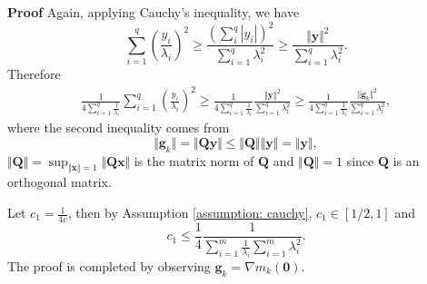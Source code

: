 \documentclass[10pt,a4paper]{amsart}
\renewenvironment{proof}[1]{\par\medskip\noindent\textbf{#1}\enspace\ignorespaces}{\par\medskip}
\begin{document}
\begin{proof}{Proof}
Again, applying Cauchy's inequality, we have
\begin{equation*}
    \sum_{i=1}^q \left(\frac{y_i}{\lambda_i}\right)^2\geq \frac{(\sum_i^q|y_i|)^2}{\sum_{i=1}^q\lambda_i^2}\geq \frac{\Vert\bm y\Vert^2}{\sum_{i=1}^q\lambda_i^2}.
\end{equation*} 
Therefore
\begin{equation*}
\begin{aligned}
    \frac{1}{4\sum_{i=1}^q\frac{1}{\lambda_i}}\sum_{i=1}^q \left(\frac{y_i}{\lambda_i}\right)^2\geq \frac{1}{4\sum_{i=1}^q\frac{1}{\lambda_i}}\frac{\Vert\bm y\Vert^2}{\sum_{i=1}^q\lambda_i^2}\geq \frac{1}{4\sum_{i=1}^q\frac{1}{\lambda_i}}\frac{\Vert\bm g_k\Vert^2}{\sum_{i=1}^q\lambda_i^2},
\end{aligned}  
\end{equation*}
where the second inequality comes from 
\begin{equation*}
    \Vert \bm g_k\Vert=\Vert\bm Q\bm y\Vert\leq \Vert\bm Q\Vert\Vert\bm y\Vert=\Vert\bm y\Vert,
\end{equation*}
$\Vert\bm Q\Vert=\sup_{\Vert\bm x\Vert=1}\Vert\bm Q\bm x\Vert$ is the matrix norm of $\bm Q$ and $\Vert\bm Q\Vert=1$ since $\bm Q$ is an orthogonal matrix. 

Let $c_1=\frac{1}{4c}$, then by Assumption \ref{assumption: cauchy}, $c_1\in[1/2,1]$ and 
\begin{equation*}
     c_1\leq\frac{1}{4}\frac{1}{\sum_{i=1}^m\frac{1}{\lambda_i}\sum_{i=1}^m\lambda_i^2}.
\end{equation*}
The proof is completed by observing $\bm g_k=\nabla m_k(\bm 0)$.  
\end{proof}
\end{document}
